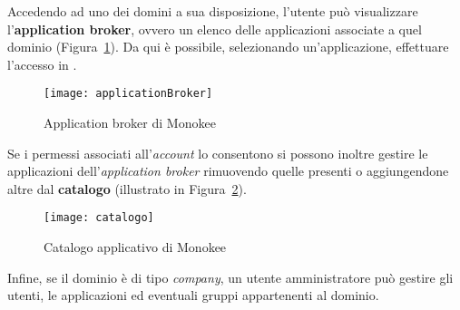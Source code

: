 Accedendo ad uno dei domini a sua disposizione, l'utente può visualizzare l'\textbf{application broker}, ovvero un elenco delle applicazioni associate a quel dominio (Figura~\ref{fig:applicationBroker}). Da qui è possibile, selezionando un'applicazione, effettuare l'accesso in . 

\begin{figure}[hbpc]
\begin{center}
\texttt{[image: applicationBroker]}
\caption{Application broker di Monokee}
\label{fig:applicationBroker}
\end{center}
\end{figure}

Se i permessi associati all'\textit{account} lo consentono si possono inoltre gestire le applicazioni dell'\textit{application broker} rimuovendo quelle presenti o aggiungendone altre dal \textbf{catalogo} (illustrato in Figura~\ref{fig:catalogo}).

\begin{figure}[hbpc]
\begin{center}
\texttt{[image: catalogo]}
\caption{Catalogo applicativo di Monokee}
\label{fig:catalogo}
\end{center}
\end{figure}

Infine, se il dominio è di tipo \textit{company}, un utente amministratore può gestire gli utenti, le applicazioni ed eventuali gruppi appartenenti al dominio.

